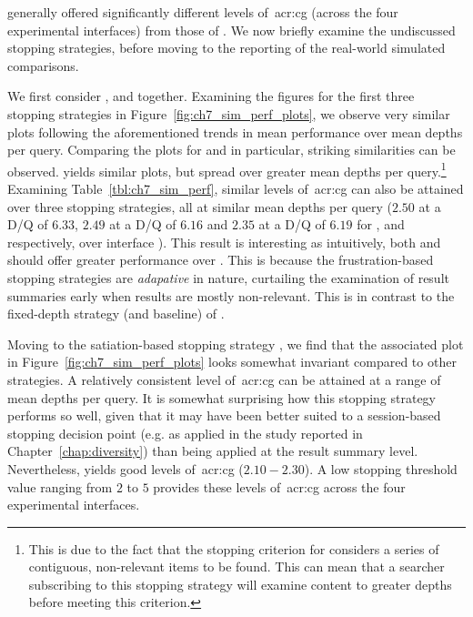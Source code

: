 \noindent
generally offered significantly different levels of~\gls{acr:cg} (across the four experimental interfaces) from those of . We now briefly examine the undiscussed stopping strategies, before moving to the reporting of the real-world simulated comparisons.

We first consider ,  and  together. Examining the figures for the first three stopping strategies in Figure~\ref{fig:ch7_sim_perf_plots}, we observe very similar plots following the aforementioned trends in mean performance over mean depths per query. Comparing the plots for  and  in particular, striking similarities can be observed.  yields similar plots, but spread over greater mean depths per query.\footnote{This is due to the fact that the stopping criterion for  considers a series of contiguous, non-relevant items to be found. This can mean that a searcher subscribing to this stopping strategy will examine content to greater depths before meeting this criterion.} Examining Table~\ref{tbl:ch7_sim_perf}, similar levels of~\gls{acr:cg} can also be attained over three stopping strategies, all at similar mean depths per query ($2.50$ at a D/Q of $6.33$, $2.49$ at a D/Q of $6.16$ and $2.35$ at a D/Q of $6.19$ for ,  and  respectively, over interface ). This result is interesting as intuitively, both  and  should offer greater performance over . This is because the frustration-based stopping strategies are \emph{adapative} in nature, curtailing the examination of result summaries early when results are mostly non-relevant. This is in contrast to the fixed-depth strategy (and baseline) of .

Moving to the satiation-based stopping strategy , we find that the associated plot in Figure~\ref{fig:ch7_sim_perf_plots} looks somewhat invariant compared to other strategies. A relatively consistent level of~\gls{acr:cg} can be attained at a range of mean depths per query. It is somewhat surprising how this stopping strategy performs so well, given that it may have been better suited to a session-based stopping decision point (e.g. as applied in the study reported in Chapter~\ref{chap:diversity}) than being applied at the result summary level. Nevertheless,  yields good levels of~\gls{acr:cg} ($2.10-2.30$). A low stopping threshold value ranging from $2$ to $5$ provides these levels of~\gls{acr:cg} across the four experimental interfaces.

